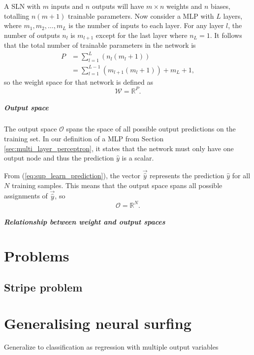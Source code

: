 A SLN with $m$ inputs and $n$ outputs will have $m \times n$ weights and $n$ biases, totalling $n(m+1)$ trainable parameters.
Now consider a MLP with $L$ layers, where $m_1, m_2, \dots, m_L$ is the number of inputs to each layer. 
For any layer $l$, the number of outputs $n_l$ is $m_{l+1}$ except for the last layer where $n_L=1$.
It follows that the total number of trainable parameters in the network is
\begin{align*}
    P &= \sum_{l=1}^{L}{\left(n_l (m_l + 1)\right)} \\
    &= \sum_{l=1}^{L-1}{\left(m_{l+1} (m_l + 1)\right)} + m_L + 1,
\end{align*}
so the weight space for that network is defined as
\begin{equation}
    \mathcal{W} = \mathbb{R}^P.
\end{equation}

\paragraph{Output space}
The output space $\mathcal{O}$ spans the space of all possible output predictions on the training set.
In our definition of a MLP from Section \ref{sec:multi_layer_perceptron}, it states that the network must only have one output node and thus the prediction $\hat{y}$ is a scalar. 

From (\ref{eq:sup_learn_prediction}), the vector $\vec{\hat{y}}$ represents the prediction $\hat{y}$ for all $N$ training samples.
This means that the output space spans all possible assignments of $\vec{\hat{y}}$, so
\begin{equation}
    \mathcal{O}=\mathbb{R}^N.
\end{equation}

\paragraph{Relationship between weight and output spaces}
\todo

\chapter{Problems}
\section{Stripe problem}


\chapter{Generalising neural surfing}
Generalize to classification as regression with multiple output variables
